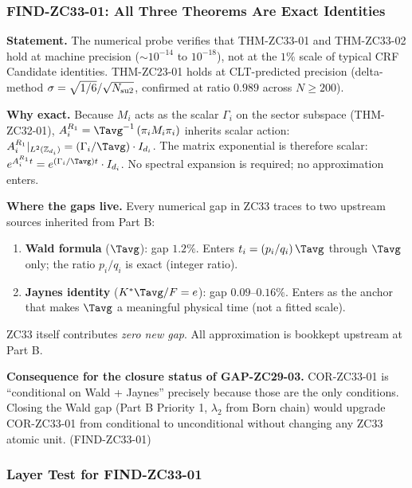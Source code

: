 \documentclass[12pt, a4paper]{article}
\begin{document}
\subsubsection{FIND-ZC33-01: All Three Theorems Are Exact Identities}

\begin{keybox}[title={FIND-ZC33-01: ZC33 introduces no new
  approximation}]
\textbf{Statement.}
The numerical probe verifies that THM-ZC33-01 and THM-ZC33-02
hold at machine precision ($\sim 10^{-14}$ to $10^{-18}$),
not at the $1\%$ scale of typical CRF Candidate identities.
THM-ZC23-01 holds at CLT-predicted precision (delta-method
$\sigma = \sqrt{1/6}/\sqrt{N_{\rm su2}}$, confirmed at ratio
$0.989$ across $N\geq 200$).

\textbf{Why exact.}
Because $M_i$ acts as the scalar $\Gamma_i$ on the sector
subspace (THM-ZC32-01), $A_i^{R_1} = \Tavg^{-1}\,(\pi_i M_i
\pi_i)$ inherits scalar action: $A_i^{R_1}|_{L^2(\mathbb{Z}_{d_i})}
= (\Gamma_i/\Tavg)\cdot I_{d_i}$. The matrix exponential is
therefore scalar: $e^{A_i^{R_1} t} = e^{(\Gamma_i/\Tavg) t}
\cdot I_{d_i}$. No spectral expansion is required; no
approximation enters.

\textbf{Where the gaps live.}
Every numerical gap in ZC33 traces to two upstream sources
inherited from Part B:
\begin{enumerate}[leftmargin=*, noitemsep]
\item \textbf{Wald formula} ($\Tavg$): gap $1.2\%$.
  Enters $t_i = (p_i/q_i)\,\Tavg$ through $\Tavg$ only;
  the ratio $p_i/q_i$ is exact (integer ratio).
\item \textbf{Jaynes identity} ($K^*\Tavg/F = e$): gap
  $0.09$--$0.16\%$. Enters as the anchor that makes $\Tavg$
  a meaningful physical time (not a fitted scale).
\end{enumerate}
ZC33 itself contributes \emph{zero new gap}. All approximation
is bookkept upstream at Part B.

\textbf{Consequence for the closure status of GAP-ZC29-03.}
COR-ZC33-01 is ``conditional on Wald + Jaynes'' precisely
because those are the only conditions. Closing the Wald gap
(Part B Priority 1, $\lambda_2$ from Born chain) would
upgrade COR-ZC33-01 from conditional to unconditional
without changing any ZC33 atomic unit.
\hfill\textup{(FIND-ZC33-01)}
\end{keybox}

\subsubsection{Layer Test for FIND-ZC33-01}
\end{document}
